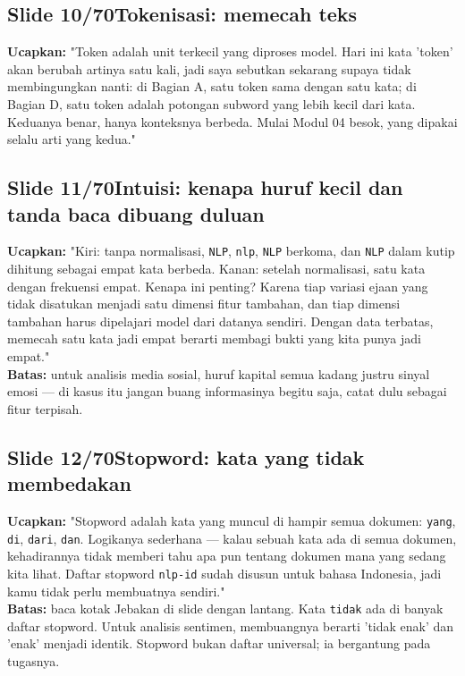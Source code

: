 \documentclass[11pt]{article}
\renewcommand{\framebox}[1]{\colorbox{acc!15}{\textcolor{acc}{\textbf{#1}}}}
\begin{document}
\subsection*{\framebox{Slide 10/70}\quad Tokenisasi: memecah teks}
\textbf{Ucapkan:} "Token adalah unit terkecil yang diproses model. Hari ini kata 'token' akan berubah artinya satu kali, jadi saya sebutkan sekarang supaya tidak membingungkan nanti: di Bagian A, satu token sama dengan satu kata; di Bagian D, satu token adalah potongan subword yang lebih kecil dari kata. Keduanya benar, hanya konteksnya berbeda. Mulai Modul 04 besok, yang dipakai selalu arti yang kedua."\\[2pt]

\subsection*{\framebox{Slide 11/70}\quad Intuisi: kenapa huruf kecil dan tanda baca dibuang duluan}
\textbf{Ucapkan:} "Kiri: tanpa normalisasi, \texttt{NLP}, \texttt{nlp}, \texttt{NLP} berkoma, dan \texttt{NLP} dalam kutip dihitung sebagai empat kata berbeda. Kanan: setelah normalisasi, satu kata dengan frekuensi empat. Kenapa ini penting? Karena tiap variasi ejaan yang tidak disatukan menjadi satu dimensi fitur tambahan, dan tiap dimensi tambahan harus dipelajari model dari datanya sendiri. Dengan data terbatas, memecah satu kata jadi empat berarti membagi bukti yang kita punya jadi empat."\\[2pt]
\textbf{Batas:} untuk analisis media sosial, huruf kapital semua kadang justru sinyal emosi — di kasus itu jangan buang informasinya begitu saja, catat dulu sebagai fitur terpisah.\\[2pt]

\subsection*{\framebox{Slide 12/70}\quad Stopword: kata yang tidak membedakan}
\textbf{Ucapkan:} "Stopword adalah kata yang muncul di hampir semua dokumen: \texttt{yang}, \texttt{di}, \texttt{dari}, \texttt{dan}. Logikanya sederhana — kalau sebuah kata ada di semua dokumen, kehadirannya tidak memberi tahu apa pun tentang dokumen mana yang sedang kita lihat. Daftar stopword \texttt{nlp-id} sudah disusun untuk bahasa Indonesia, jadi kamu tidak perlu membuatnya sendiri."\\[2pt]
\textbf{Batas:} baca kotak Jebakan di slide dengan lantang. Kata \texttt{tidak} ada di banyak daftar stopword. Untuk analisis sentimen, membuangnya berarti 'tidak enak' dan 'enak' menjadi identik. Stopword bukan daftar universal; ia bergantung pada tugasnya.\\[2pt]
\end{document}
